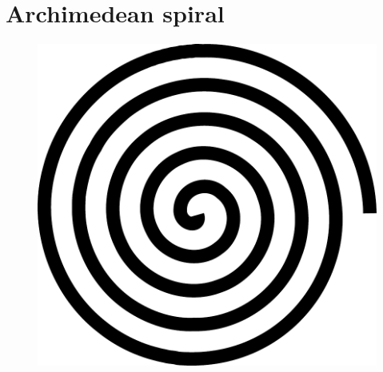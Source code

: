 \documentclass[12pt,openany,a4,usenames,dvipsnames]{book}
\begin{document}
\chapter{Archimedean spiral}
\begin{figure}[H]
  \centering
  \includegraphics[height=12\baselineskip,keepaspectratio]{figures/archspiral.pdf}
\end{figure}
\end{document}

